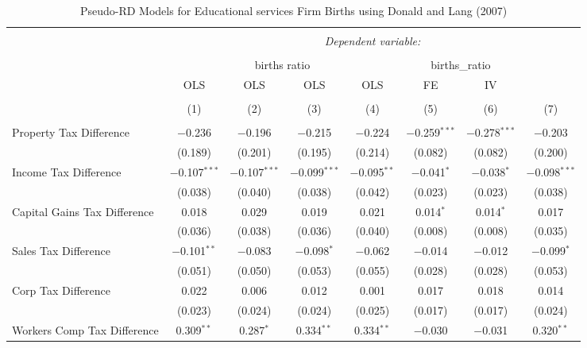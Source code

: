 
\begin{table}[!htbp] \centering 
  \caption{Pseudo-RD Models for  Educational services Firm Births using Donald and Lang (2007)} 
  \label{} 
\begin{tabular}{@{\extracolsep{5pt}}lccccccc} 
\\[-1.8ex]\hline 
\hline \\[-1.8ex] 
 & \multicolumn{7}{c}{\textit{Dependent variable:}} \\ 
\cline{2-8} 
\\[-1.8ex] & \multicolumn{4}{c}{births ratio} & \multicolumn{2}{c}{births\_ratio} &   \\ 
 & OLS & OLS & OLS & OLS & FE & IV &  \\ 
\\[-1.8ex] & (1) & (2) & (3) & (4) & (5) & (6) & (7)\\ 
\hline \\[-1.8ex] 
 Property Tax Difference & $-$0.236 & $-$0.196 & $-$0.215 & $-$0.224 & $-$0.259$^{***}$ & $-$0.278$^{***}$ & $-$0.203 \\ 
  & (0.189) & (0.201) & (0.195) & (0.214) & (0.082) & (0.082) & (0.200) \\ 
  Income Tax Difference & $-$0.107$^{***}$ & $-$0.107$^{***}$ & $-$0.099$^{***}$ & $-$0.095$^{**}$ & $-$0.041$^{*}$ & $-$0.038$^{*}$ & $-$0.098$^{***}$ \\ 
  & (0.038) & (0.040) & (0.038) & (0.042) & (0.023) & (0.023) & (0.038) \\ 
  Capital Gains Tax Difference & 0.018 & 0.029 & 0.019 & 0.021 & 0.014$^{*}$ & 0.014$^{*}$ & 0.017 \\ 
  & (0.036) & (0.038) & (0.036) & (0.040) & (0.008) & (0.008) & (0.035) \\ 
  Sales Tax Difference & $-$0.101$^{**}$ & $-$0.083 & $-$0.098$^{*}$ & $-$0.062 & $-$0.014 & $-$0.012 & $-$0.099$^{*}$ \\ 
  & (0.051) & (0.050) & (0.053) & (0.055) & (0.028) & (0.028) & (0.053) \\ 
  Corp Tax Difference & 0.022 & 0.006 & 0.012 & 0.001 & 0.017 & 0.018 & 0.014 \\ 
  & (0.023) & (0.024) & (0.024) & (0.025) & (0.017) & (0.017) & (0.024) \\ 
  Workers Comp Tax Difference & 0.309$^{**}$ & 0.287$^{*}$ & 0.334$^{**}$ & 0.334$^{**}$ & $-$0.030 & $-$0.031 & 0.320$^{**}$ \\ 

\end{tabular}
\end{table}
